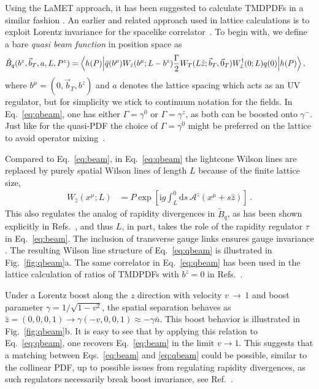 \documentclass[prd,aps,twocolumn,bibnotes,nofootinbib,preprintnumbers,floatfix]{revtex4-1}
\DeclareRobustCommand{\eq}[1]{Eq.~\eqref{eq:#1}}
\DeclareRobustCommand{\eqs}[2]{Eqs.~\eqref{eq:#1} and \eqref{eq:#2}}
\DeclareRobustCommand{\fig}[1]{Fig.~\ref{fig:#1}}
\DeclareRobustCommand{\mycite}[1]{Ref.~\cite{#1}}
\DeclareRobustCommand{\mycites}[1]{Refs.~\cite{#1}}
\newcommand{\df}{\mathrm{d}}
\newcommand{\img}{\mathrm{i}}
\newcommand{\cA}{\mathcal{A}}
\newcommand{\bn}{{\bar{n}}}
\newcommand{\bt}{\vec b_T}
\begin{document}
\begin{widetext}
Using the LaMET approach, it has been suggested to calculate TMDPDFs in a similar fashion \cite{Ji:2014hxa,Ji:2018hvs,Ebert:2019okf}. 
An earlier and related approach used in lattice calculations is to exploit Lorentz invariance for the spacelike correlator~\cite{Musch:2010ka,Musch:2011er}.
To begin with, we define a bare \emph{quasi beam function} in position space as
\begin{align} \label{eq:qbeam}
 \tilde B_{q}(b^z, \bt, a,L,P^z)
 =
 \Bigl< h(P) \Big| &\bar q(b^\mu) W_{\hat z}(b^\mu;L-b^z) \frac{\Gamma}{2}
 W_T(L \hat z; \bt, \vec{0}_T) W^\dagger_{\hat z}(0;L) q(0) \Big| h(P) \Bigr>
\,,\end{align}
where $b^\mu = (0, \bt, b^z)$ and $a$ denotes the lattice spacing which acts as an UV regulator, but for simplicity we stick to continuum notation for the fields.
In \eq{qbeam}, one has either $\Gamma=\gamma^0$ or $\Gamma=\gamma^z$, as both can be boosted onto $\gamma^-$.  Just like for the quasi-PDF the choice of $\Gamma=\gamma^0$ might be preferred on the lattice to avoid operator mixing~\cite{Constantinou:2017sej,Green:2017xeu,Chen:2017mie}.
\end{widetext}

Compared to \eq{beam}, in \eq{qbeam} the lightcone Wilson lines are replaced by purely spatial Wilson lines
of length $L$ because of the finite lattice size,
\begin{align} \label{eq:coll_Wilson_L}
 W_{\hat z}(x^\mu;L) &= P \exp\left[ \img g \int_{L}^0 \df s \, \cA^z(x^\mu + s \hat z) \right]
\,.\end{align}
This also regulates the analog of rapidity divergences in $\tilde B_q$,
as has been shown explicitly in \mycites{Ji:2018hvs,Ebert:2019okf}, and thus $L$, in part, takes the role of the rapidity regulator $\tau$ in \eq{beam}.
The inclusion of transverse gauge links ensures gauge invariance \cite{Ji:2002aa,Belitsky:2002sm,Idilbi:2010im,GarciaEchevarria:2011md}.
The resulting Wilson line structure of \eq{qbeam} is illustrated in \fig{qbeam}a. The same correlator in \eq{qbeam} has been used in the lattice calculation of ratios of TMDPDFs with $b^z=0$ in \mycites{Musch:2011er,Engelhardt:2015xja,Yoon:2016dyh,Yoon:2017qzo}.

Under a Lorentz boost along the $z$ direction with velocity $v\,{\to}\,1$ and boost parameter $\gamma=1/\sqrt{1-v^2}$, the spatial separation behaves as $\hat z = (0,0,0,1) \to \gamma (-v,0,0,1) \approx -\gamma \bn$.
This boost behavior is illustrated in \fig{qbeam}b.
It is easy to see that by applying this relation to \eq{qbeam}, one recovers \eq{beam} in the limit $v \to 1$.
This suggests that a matching between \eqs{beam}{qbeam} could be possible, similar to the collinear PDF,
up to possible issues from regulating rapidity divergences, as such regulators necessarily break boost invariance, see \mycite{Ebert:2019okf}.
\end{document}
